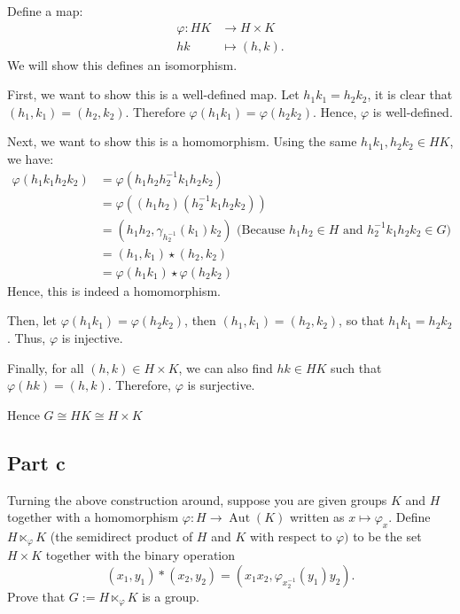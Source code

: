 \begin{answer}
    Define a map:
    \begin{equation}
        \begin{aligned}
            \varphi: HK &\to H \times K\\
            hk &\mapsto (h,k).
        \end{aligned}
    \end{equation}
    We will show this defines an isomorphism.
    
    First, we want to show this is a well-defined map. Let $h_1k_1 = h_2k_2$, it is clear that $(h_1,k_1) = (h_2,k_2)$. Therefore $\varphi(h_1k_1) = \varphi(h_2k_2)$. Hence, $\varphi$ is well-defined.
    
    Next, we want to show this is a homomorphism. Using the same $h_1k_1, h_2k_2 \in HK$, we have:
    \begin{equation}
        \begin{aligned}
            \varphi(h_1k_1h_2k_2) &= \varphi(h_1h_2h_2^{-1}k_1h_2k_2)\\
            &= \varphi((h_1h_2)(h_2^{-1}k_1h_2k_2))\\
            &= (h_1h_2,\gamma_{h_2^{-1}}(k_1)k_2) \text{ (Because $h_1h_2 \in H$ and $h_2^{-1}k_1h_2k_2 \in G$)}\\
            &= (h_1,k_1) \star (h_2,k_2)\\
            &= \varphi(h_1k_1) \star \varphi(h_2k_2)
        \end{aligned}
    \end{equation}
    Hence, this is indeed a homomorphism.
    
    Then, let $\varphi(h_1k_1) = \varphi(h_2k_2)$, then $(h_1,k_1) = (h_2,k_2)$, so that $h_1k_1 = h_2k_2$. Thus, $\varphi$ is injective.
    
    Finally, for all $(h,k) \in H\times K$, we can also find $hk \in HK$ such that $\varphi(hk) = (h,k)$. Therefore, $\varphi$ is surjective.
    
    Hence $G \cong HK \cong H\times K$
\end{answer}

\subsection{Part c}

\begin{question}
    Turning the above construction around, suppose you are given groups $K$ and $H$ together with a homomorphism $\varphi: H \rightarrow \operatorname{Aut}(K)$ written as $x \mapsto \varphi_x$. Define $H \ltimes_{\varphi} K$ (the semidirect product of $H$ and $K$ with respect to $\varphi)$ to be the set $H \times K$ together with the binary operation
    $$
    \left(x_1, y_1\right) *\left(x_2, y_2\right)=\left(x_1 x_2, \varphi_{x_2^{-1}}\left(y_1\right) y_2\right) .
    $$
    Prove that $G:=H \ltimes_{\varphi} K$ is a group.
\end{question}

